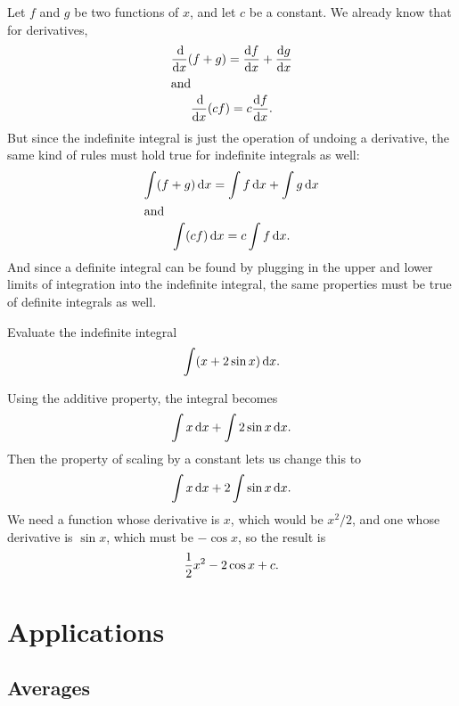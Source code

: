 Let $f$ and $g$ be two functions of $x$, and let $c$ be a constant. We already know that for derivatives,
\begin{gather*}
  \frac{\der}{\der x}(f+g) = \frac{\der f}{\der x} + \frac{\der g}{\der x} \\
\intertext{and}
  \frac{\der}{\der x}(cf) = c\frac{\der f}{\der x}\eqquad.
\end{gather*}
But since the indefinite integral is just the operation of undoing a derivative, the
same kind of rules must hold true for indefinite integrals as well:
\begin{gather*}
  \int(f+g)\operatorname{d\!} x =   \int f \operatorname{d\!} x +   \int g \operatorname{d\!} x \\
\intertext{and}
  \int(cf)\operatorname{d\!} x =   c \int f \operatorname{d\!} x.
\end{gather*}
And since a definite integral can be found by plugging in the upper and lower limits of integration
into the indefinite integral, the same properties must be true of definite integrals as well.

\begin{eg}
\egquestion Evaluate the indefinite integral
\begin{equation*}
  \int (x+2\sin x) \operatorname{d\!} x.
\end{equation*}

\eganswer
Using the additive property, the integral becomes
\begin{equation*}
 \int x \operatorname{d\!} x +   \int 2\sin x \operatorname{d\!} x.
\end{equation*}
Then the property of scaling by a constant lets us change this to
\begin{equation*}
                             \int x \operatorname{d\!} x +   2 \int \sin x \operatorname{d\!} x.
\end{equation*}
We need a function whose derivative is $x$, which would be $x^2/2$, and
one whose derivative is $\sin x$, which must be $-\cos x$, so the result is
\begin{equation*}
                             \frac{1}{2}x^2 -   2 \cos x + c.
\end{equation*}
\end{eg}

\section{Applications}

\subsection{Averages}

